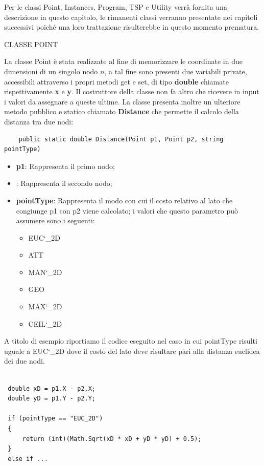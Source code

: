\documentclass[11pt]{article}
\begin{document}
Per le classi Point, Instances, Program, TSP e Utility verr\`a fornita una descrizione in questo capitolo, le rimanenti classi verranno presentate nei capitoli successivi poich\'e una loro trattazione risulterebbe in questo momento prematura. 


\vspace{2\baselineskip}
CLASSE POINT
\vspace{2\baselineskip}

La classe Point \`e stata realizzate al fine di memorizzare le coordinate in due dimensioni di un singolo nodo $n$, a tal fine sono presenti due variabili private, accessibili attraverso i propri metodi get e set, di tipo \textbf{double} chiamate rispettivamente \textbf{x} e \textbf{y}. Il costruttore della classe non fa altro che ricevere in input i valori da assegnare a queste ultime. La classe presenta inoltre un ulteriore metodo pubblico e statico chiamato \textbf{Distance} che permette il calcolo della distanza tra due nodi:

\begin{lstlisting}
    public static double Distance(Point p1, Point p2, string pointType)
\end{lstlisting}

\begin{itemize}
\item \textbf{p1}: Rappresenta il primo nodo;
\item {}: Rappresenta il secondo nodo;
\item \textbf{pointType}: Rappresenta il modo con cui il costo relativo al lato che congiunge p1 con p2 viene calcolato; i valori che questo parametro pu\`o assumere sono i seguenti:
	\begin{itemize}
	\item EUC\char`_2D
	\item ATT
	\item MAN\char`_2D
	\item GEO
	\item MAX\char`_2D	
	\item CEIL\char`_2D
	\end{itemize}
\end{itemize}

A titolo di esempio riportiamo il codice eseguito nel caso in cui pointType risulti uguale a EUC\char`_2D dove il costo del lato deve risultare pari alla distanza euclidea dei due nodi. 

\begin{lstlisting}

 double xD = p1.X - p2.X;
 double yD = p1.Y - p2.Y;
 
 if (pointType == "EUC_2D")
 {
     return (int)(Math.Sqrt(xD * xD + yD * yD) + 0.5);
 }
 else if ...
            
\end{lstlisting}
\end{document}
